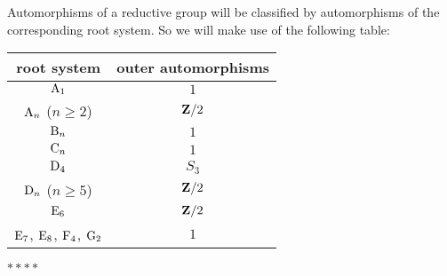 Automorphisms of a reductive group will be classified by automorphisms of the 
corresponding root system. So we will make use of the following table:
\begin{center}
\begin{tabular}{c|c}
  root system                 & outer automorphisms \\ \hline
  $\mathrm{A}_1$                  & $1$ \\
  $\mathrm{A}_n$ ($n\geqslant 2$) & $\mathbf{Z}/2$  \\
  $\mathrm{B}_n$                  & $1$ \\
  $\mathrm{C}_n$                  & $1$ \\
  $\mathrm{D}_4$                  & $S_3$ \\
  $\mathrm{D}_n$ ($n\geqslant 5$) & $\mathbf{Z}/2$ \\
  $\mathrm{E}_6$                  & $\mathbf{Z}/2$ \\
  $\mathrm{E}_7$, $\mathrm{E}_8$, $\mathrm{F}_4$, $\mathrm{G}_2$ & $1$
\end{tabular}
\end{center}


$\ast\ast\ast\ast$

